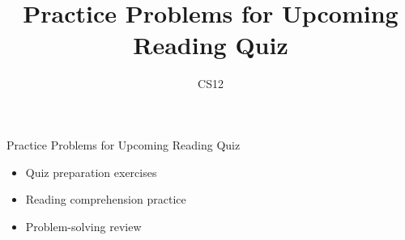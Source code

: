 \documentclass{beamer}
\title{Practice Problems for Upcoming Reading Quiz}
\author{CS12}
\date{}
\begin{document}
\begin{frame}
    \titlepage
\end{frame}

\begin{frame}{Practice Problems for Upcoming Reading Quiz}
    \begin{itemize}
        \item Quiz preparation exercises
        \item Reading comprehension practice
        \item Problem-solving review
    \end{itemize}
\end{frame}
\end{document}
